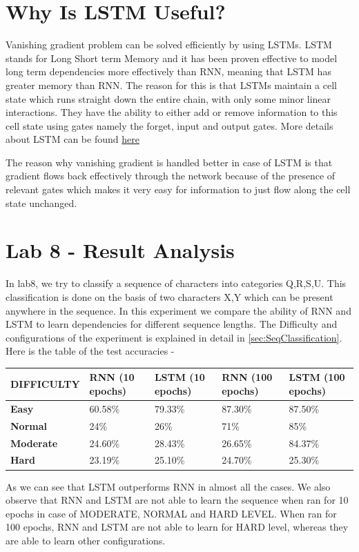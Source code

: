 \section{Why Is LSTM Useful?}
Vanishing gradient problem can be solved efficiently by using LSTMs.
LSTM stands for Long Short term Memory and it has been proven effective to model long term dependencies more effectively than RNN, meaning that LSTM has greater memory than RNN.
The reason for this is that LSTMs maintain a cell state which runs straight down the entire chain, with only some minor linear interactions.
They have the ability to either add or remove information to this cell state using gates namely the forget, input  and output gates.
More details about LSTM can be found \hyperref[sec:long-short-term-memory]{here}


The reason why vanishing gradient is handled better in case of LSTM is that gradient flows back effectively through the network because of the presence of relevant gates which makes it very easy for information to just flow along the cell state unchanged.


\section{Lab 8 - Result Analysis}
In lab8, we try to classify a sequence of characters into categories Q,R,S,U. 
This classification is done on the basis of two characters X,Y which can be present anywhere in the sequence. 
In this experiment we compare the ability of RNN and LSTM to learn dependencies for different sequence lengths. The Difficulty and configurations of the experiment is explained in detail in \cref{sec:SeqClassification}. Here is the table of the test accuracies - 

\begin{center}
\begin{tabular}{ | p{3cm} | p{2cm} | p{2cm} | p{2cm} | p{2cm} | }
 \hline
   \textbf{DIFFICULTY} & \textbf{RNN (10 epochs)} & \textbf{LSTM (10 epochs)} & \textbf{RNN (100 epochs)} & \textbf{LSTM (100 epochs)} \\ 
 \hline
 \textbf{Easy} & 60.58\% & 79.33\% & 87.30\% & 87.50\% \\
 \hline
\textbf{Normal} & 24\% & 26\% & 71\% & 85\% \\ 
 \hline
 \textbf{Moderate} & 24.60\% & 28.43\% & 26.65\% & 84.37\% \\ 
 \hline
 \textbf{Hard} & 23.19\% & 25.10\% & 24.70\% & 25.30\% \\ 
 \hline
\end{tabular}

\end{center}
As we can see that LSTM outperforms RNN in almost all the cases.
We also observe that RNN and LSTM are not able to learn the sequence when ran for 10 epochs in case of MODERATE, NORMAL and HARD LEVEL.
When ran for 100 epochs, RNN and LSTM are not able to learn for HARD level, whereas they are able to learn other configurations. 